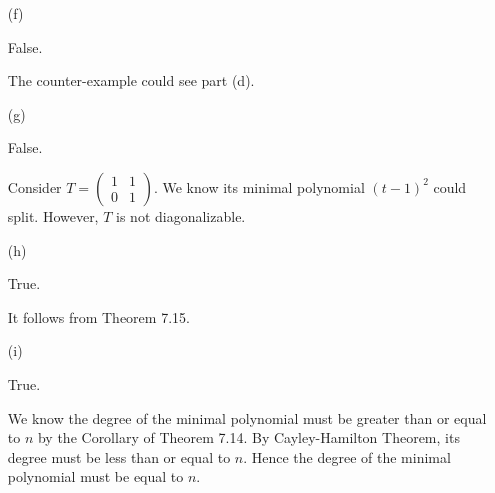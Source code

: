 \begin{Exercise}
\begin{enumerate}[(a)]
		\item[(f)]
		\begin{answer}
			False.
		\end{answer}
		\begin{solution}
			The counter-example could see part (d).
		\end{solution}
		
		\item[(g)]
		\begin{answer}
			False.
		\end{answer}
		\begin{solution}
			Consider $T = \begin{pmatrix}
			1 & 1 \\
			0 & 1
			\end{pmatrix}$. We know its minimal polynomial $(t-1)^2$ could split.
			However, $T$ is not diagonalizable.
		\end{solution}
		
		\item[(h)]
		\begin{answer}
			True.
		\end{answer}
		\begin{solution}
			It follows from Theorem 7.15.
		\end{solution}
		
		\item[(i)]
		\begin{answer}
			True.
		\end{answer}
		\begin{solution}
			We know the degree of the minimal polynomial must be greater than or equal to $n$ by the Corollary of Theorem 7.14.
			By Cayley-Hamilton Theorem, its degree must be less than or equal to $n$.
			Hence the degree of the minimal polynomial must be equal to $n$.
		\end{solution}
		
	\end{enumerate}
\end{Exercise}